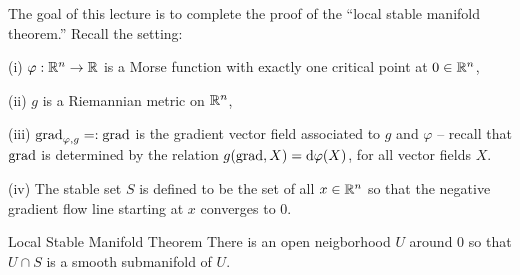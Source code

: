\documentclass{amsart}
\begin{document}
The goal of this lecture is to complete the proof of the ``local stable manifold theorem.'' Recall the setting:

(i) $\varphi:\mathbb{R}^{n}\to \mathbb{R}$ is a Morse function with exactly one critical point at $0\in \mathbb{R}^{n}$,

(ii) $g$ is a Riemannian metric on $\mathbb{R}^{n}$,

(iii) $\mathrm{grad}_{\varphi,g}=:\mathrm{grad}$ is the gradient vector field associated to $g$ and $\varphi$ -- recall that $\mathrm{grad}$ is determined by the relation $g(\mathrm{grad},X)=\mathrm{d}\varphi(X)$, for all vector fields $X$.

(iv) The stable set $S$ is defined to be the set of all $x\in \mathbb{R}^{n}$ so that the negative gradient flow line starting at $x$ converges to $0$.

\begin{clear}{Local Stable Manifold Theorem}
  There is an open neigborhood $U$ around $0$ so that $U\cap S$ is a smooth submanifold of $U$.
\end{clear}
\end{document}
